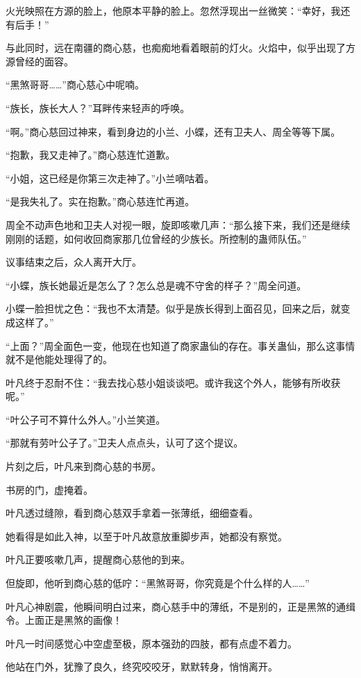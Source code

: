 \begin{this_body}
火光映照在方源的脸上，他原本平静的脸上。忽然浮现出一丝微笑：“幸好，我还有后手！”

与此同时，远在南疆的商心慈，也痴痴地看着眼前的灯火。火焰中，似乎出现了方源曾经的面容。

“黑煞哥哥……”商心慈心中呢喃。

“族长，族长大人？”耳畔传来轻声的呼唤。

“啊。”商心慈回过神来，看到身边的小兰、小蝶，还有卫夫人、周全等等下属。

“抱歉，我又走神了。”商心慈连忙道歉。

“小姐，这已经是你第三次走神了。”小兰嘀咕着。

“是我失礼了。实在抱歉。”商心慈连忙再道。

周全不动声色地和卫夫人对视一眼，旋即咳嗽几声：“那么接下来，我们还是继续刚刚的话题，如何收回商家那几位曾经的少族长。所控制的蛊师队伍。”

议事结束之后，众人离开大厅。

“小蝶，族长她最近是怎么了？怎么总是魂不守舍的样子？”周全问道。

小蝶一脸担忧之色：“我也不太清楚。似乎是族长得到上面召见，回来之后，就变成这样了。”

“上面？”周全面色一变，他现在也知道了商家蛊仙的存在。事关蛊仙，那么这事情就不是他能处理得了的。

叶凡终于忍耐不住：“我去找心慈小姐谈谈吧。或许我这个外人，能够有所收获呢。”

“叶公子可不算什么外人。”小兰笑道。

“那就有劳叶公子了。”卫夫人点点头，认可了这个提议。

片刻之后，叶凡来到商心慈的书房。

书房的门，虚掩着。

叶凡透过缝隙，看到商心慈双手拿着一张薄纸，细细查看。

她看得是如此入神，以至于叶凡故意放重脚步声，她都没有察觉。

叶凡正要咳嗽几声，提醒商心慈他的到来。

但旋即，他听到商心慈的低咛：“黑煞哥哥，你究竟是个什么样的人……”

叶凡心神剧震，他瞬间明白过来，商心慈手中的薄纸，不是别的，正是黑煞的通缉令。上面正是黑煞的画像！

叶凡一时间感觉心中空虚至极，原本强劲的四肢，都有点虚不着力。

他站在门外，犹豫了良久，终究咬咬牙，默默转身，悄悄离开。


\end{this_body}
